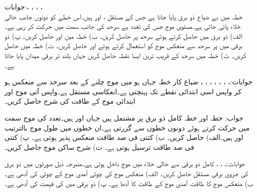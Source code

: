 جوابات:، ، ، ،\\
خطہ  میں بے ضیاع ذو برق پایا جاتا ہے جس  کے مستقل ،  اور  ہیں۔اس خطے کو دونوں جانب خالی خلاء پائی جاتی ہے۔مستوی موج جس کی تعدد  ہے سرحد  کی جانب  سمت میں حرکت کر رہی ہے۔ الف)  ذو برق میں  حاصل کرتے ہوئے سرحد  پر  حاصل کریں۔ ب) خطہ  میں  اور  حاصل کریں۔ پ) ذو برقی میں  پر سرحد سے منعکس موج کو استعمال کرتے ہوئے  اور  حاصل کریں۔ ت) خطہ  میں  حاصل کریں۔ ٹ) خطہ  میں سرحد کے قریب ترین ایسا نقطہ حاصل کریں جہاں بلند تر برقی میدان پایا جاتا ہے۔ 

جوابات:، ، ، ، ، ، ، 
ضیاع کار خطہ جہاں  ہو میں موج  چلنے کے بعد سرحد سے منعکس ہو کر واپس اسی ابتدائی نقطے تک پہنچتی ہے۔انعکاسی مستقل  ہے۔واپس آتی موج اور ابتدائی موج کے طاقت کی شرح حاصل کریں۔

جواب:
خطہ  اور خطہ  کامل ذو برق پر مشتمل ہیں جہاں  اور  ہیں۔تعدد  کی موج  سمت میں حرکت کرتے ہوئے دونوں خطوں سے گزرتی ہے۔ان خطوں میں طول موج بالترتیب  اور  ہیں۔الف)  حاصل کریں۔ ب) کتنی فی صد طاقت منعکس پذیر ہوتی ہے۔ پ) کتنی فی صد طاقت ترسیل ہوتی ہے۔ ت) شرح ساکن موج  حاصل کریں۔

جوابات:، ، ، 
کامل ذو برقی  سے خالی خلاء میں موج داخل ہوتی ہے۔مندرجہ ذیل صورتوں میں ذو برق کی جزوی برقی مستقل  حاصل کریں۔ الف) منعکس موج کی چوٹی آمدی موج کے چوٹی کی آدھی ہے۔ ب) منعکس موج کا طاقت آمدی موج کے طاقت کا آدھا ہے۔ پ) ذو برقی میں  کی قیمت  کی آدھی ہے۔

